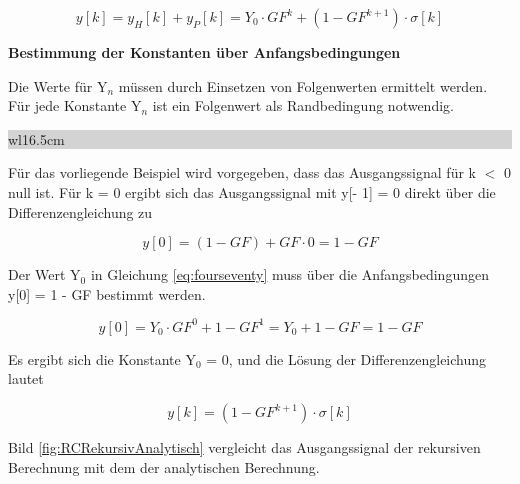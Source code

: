 \begin{equation}\label{eq:fourseventy}
y\left[k\right]=y_{H} \left[k\right]+y_{P} \left[k\right]=Y_{0} \cdot GF^{k} +\left(1-GF^{k+1} \right)\cdot \sigma \left[k\right]
\end{equation}

{\selectfont
\noindent\textbf{Bestimmung der Konstanten über Anfangsbedingungen}} \smallskip

\noindent Die Werte f\"{u}r Y${}_{n}$ m\"{u}ssen durch Einsetzen von Folgenwerten ermittelt werden. F\"{u}r jede Konstante Y${}_{n}$ ist ein Folgenwert als Randbedingung notwendig. \bigskip

\noindent
\colorbox{lightgray}{%
%
\renewcommand\arraystretch{0.6}%
\begin{tabular}{ wl{16.5cm} }
{\selectfont{Beispiel: Sprungantwort eines Tiefpasses - Bestimmung der Konstanten}}
\end{tabular}%
}\medskip

\noindent F\"{u}r das vorliegende Beispiel wird vorgegeben, dass das Ausgangssignal f\"{u}r k $\mathrm{<}$ 0 null ist. F\"{u}r k = 0 ergibt sich das Ausgangssignal mit y[- 1] = 0 direkt \"{u}ber die Differenzengleichung zu

\begin{equation}\label{eq:fourseventyone}
y\left[0\right]=\left(1-GF\right)+GF\cdot 0=1-GF
\end{equation}

\noindent Der Wert Y${}_{0}$ in Gleichung \eqref{eq:fourseventy} muss \"{u}ber die Anfangsbedingungen y[0] = 1 - GF bestimmt werden. 

\begin{equation}\label{eq:fourseventytwo}
y\left[0\right]=Y_{0} \cdot GF^{0} +1-GF^{1} =Y_{0} +1-GF=1-GF
\end{equation}

\noindent Es ergibt sich die Konstante Y$_{0}$ = 0, und die L\"{o}sung der Differenzengleichung lautet

\begin{equation}\label{eq:fourseventythree}
y\left[k\right]=\left(1-GF^{k+1} \right)\cdot \sigma \left[k\right]
\end{equation}

\noindent Bild \ref{fig:RCRekursivAnalytisch} vergleicht das Ausgangssignal der rekursiven Berechnung mit dem der analytischen Berechnung. 

\clearpage

